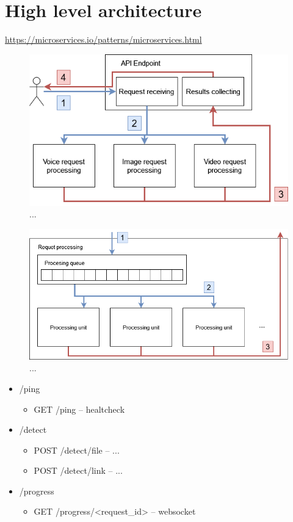 \section{High level architecture}
\url{https://microservices.io/patterns/microservices.html}
\begin{figure}[H]
    \centering
    \includegraphics[width=.7\linewidth]{other-fig/framework_architecture.png}        
    \caption{...}
    \label{fig:xxx}
\end{figure}

\begin{figure}[H]
    \centering
    \includegraphics[width=.65\linewidth]{other-fig/framework_architecture_request_processing.png}        
    \caption{...}
\label{fig:xxx}
\end{figure}

\begin{itemize}
\item /ping
    \begin{itemize}
        \item GET /ping – healtcheck
    \end{itemize}
\item /detect
    \begin{itemize}
        \item POST /detect/file – ...
        \item POST /detect/link – ...
    \end{itemize}
\item /progress
    \begin{itemize}
        \item GET /progress/<request\_id> – websocket    
    \end{itemize}
\end{itemize}


